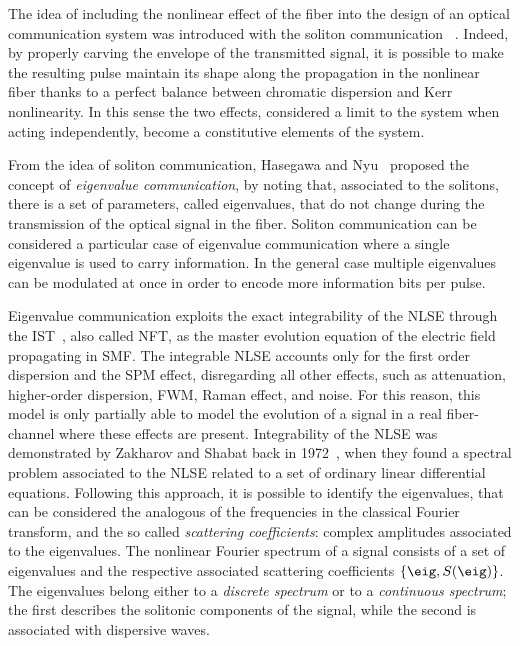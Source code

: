 The idea of including the nonlinear effect of the fiber into the design of an
optical communication system  was introduced with the soliton communication
~\cite{hasegawa1973transmission,nakazawa199110,mollenauer1988demonstration}.
Indeed, by properly carving the envelope of the transmitted signal,
it is possible to make the resulting pulse maintain its shape along the propagation in the
nonlinear fiber thanks to a perfect balance between  chromatic
dispersion and  Kerr nonlinearity. In this sense the two effects,
considered a limit to the system when acting independently, become a
constitutive elements of the system.

From the idea of soliton communication, Hasegawa and Nyu~\cite{Hasegawa} proposed the concept of \emph{eigenvalue communication}, by noting that, associated to the solitons, there is a set of parameters, called eigenvalues, that do not change during the transmission of the optical signal in the fiber. Soliton communication
can be considered a particular case of eigenvalue communication where a single eigenvalue is used to carry information. In the general case multiple eigenvalues can be modulated at once in order to encode more information bits per pulse.

Eigenvalue communication exploits the exact integrability of the \ac{NLSE} through the \ac{IST}~\cite{ablowitz1974inverse}, also called \ac{NFT}, as the master evolution equation of the electric field propagating in \ac{SMF}. The integrable \ac{NLSE} accounts only for the first order dispersion and the \ac{SPM} effect, disregarding all other effects, such as
attenuation, higher-order dispersion, \ac{FWM}, Raman effect, and noise. For this reason, this model is only partially able to model the evolution of a signal in a real fiber-channel where these effects are present.
Integrability of the \ac{NLSE} was demonstrated by Zakharov and Shabat back in 1972~\cite{shabat1972exact}, when they found a spectral problem associated to the \ac{NLSE} related to a set of ordinary linear differential equations.
Following this approach, it is possible to identify the eigenvalues, that can be considered the analogous of the frequencies in the classical Fourier transform, and the so called \textit{scattering coefficients}: complex amplitudes associated to the eigenvalues.
The nonlinear Fourier spectrum of a signal consists of a set of eigenvalues and the respective associated scattering coefficients $\{\eig, S(\eig)\}$.
The eigenvalues belong either to a \emph{discrete spectrum} or to a \emph{continuous spectrum}; the first describes the solitonic components of the signal, while the second is associated with dispersive waves.

